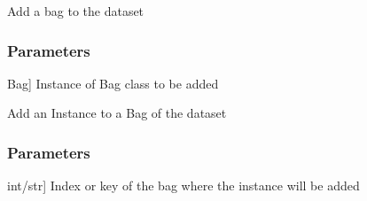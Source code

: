 \documentclass[letterpaper,10pt,english]{sphinxmanual}
\begin{document}
\begin{fulllineitems}
\begin{fulllineitems}
\begin{description}
\end{description}

\end{fulllineitems}


\begin{fulllineitems}
\label{\detokenize{data/_autosummary/miml.data.miml_dataset.MIMLDataset:miml.data.miml_dataset.MIMLDataset.add_bag}}
\pysigstartsignatures
{}
\pysigstopsignatures
\sphinxAtStartPar
Add a bag to the dataset


\subsubsection{Parameters}
\label{\detokenize{data/_autosummary/miml.data.miml_dataset.MIMLDataset:id1}}\begin{description}
\sphinxlineitem{bag}{[}Bag{]}
\sphinxAtStartPar
Instance of Bag class to be added

\end{description}

\end{fulllineitems}


\begin{fulllineitems}
\label{\detokenize{data/_autosummary/miml.data.miml_dataset.MIMLDataset:miml.data.miml_dataset.MIMLDataset.add_instance}}
\pysigstartsignatures
{}
\pysigstopsignatures
\sphinxAtStartPar
Add an Instance to a Bag of the dataset


\subsubsection{Parameters}
\label{\detokenize{data/_autosummary/miml.data.miml_dataset.MIMLDataset:id2}}\begin{description}
\sphinxlineitem{bag}{[}int/str{]}
\sphinxAtStartPar
Index or key of the bag where the instance will be added


\end{description}
\end{fulllineitems}
\end{fulllineitems}
\end{document}

